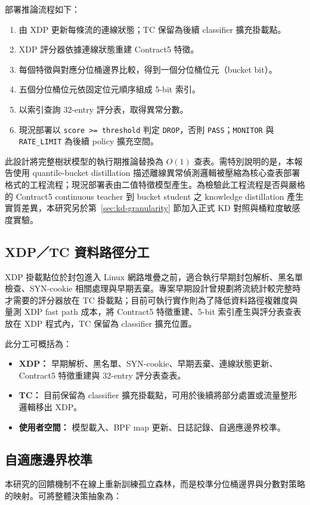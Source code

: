 \documentclass[12pt, a4paper, fontset=none]{ctexart}
\newcommand{\code}[1]{\texttt{#1}}
\begin{document}
部署推論流程如下：

\begin{enumerate}
  \item 由 XDP 更新每條流的連線狀態；TC 保留為後續 classifier 擴充掛載點。
  \item XDP 評分器依據連線狀態重建 Contract5 特徵。
  \item 每個特徵與對應分位桶邊界比較，得到一個分位桶位元（bucket bit）。
  \item 五個分位桶位元依固定位元順序組成 5-bit 索引。
  \item 以索引查詢 32-entry 評分表，取得異常分數。
  \item 現況部署以 \code{score >= threshold} 判定 \code{DROP}，否則 \code{PASS}；\code{MONITOR} 與 \code{RATE\_LIMIT} 為後續 policy 擴充空間。
\end{enumerate}

此設計將完整樹狀模型的執行期推論替換為 $O(1)$ 查表。需特別說明的是，本報告使用 quantile-bucket distillation 描述離線異常偵測邏輯被壓縮為核心查表部署格式的工程流程；現況部署表由二值特徵模型產生。為檢驗此工程流程是否與嚴格的 Contract5 continuous teacher 到 bucket student 之 knowledge distillation 產生實質差異，本研究另於第~\ref{sec:kd-granularity} 節加入正式 KD 對照與桶粒度敏感度實驗。

\subsection{XDP／TC 資料路徑分工}
XDP 掛載點位於封包進入 Linux 網路堆疊之前，適合執行早期封包解析、黑名單檢查、SYN-cookie 相關處理與早期丟棄。專案早期設計曾規劃將流統計較完整時才需要的評分器放在 TC 掛載點；目前可執行實作則為了降低資料路徑複雜度與量測 XDP fast path 成本，將 Contract5 特徵重建、5-bit 索引產生與評分表查表放在 XDP 程式內，TC 保留為 classifier 擴充位置。

此分工可概括為：

\begin{itemize}
  \item \textbf{XDP：} 早期解析、黑名單、SYN-cookie、早期丟棄、連線狀態更新、Contract5 特徵重建與 32-entry 評分表查表。
  \item \textbf{TC：} 目前保留為 classifier 擴充掛載點，可用於後續將部分處置或流量整形邏輯移出 XDP。
  \item \textbf{使用者空間：} 模型載入、BPF map 更新、日誌記錄、自適應邊界校準。
\end{itemize}

\subsection{自適應邊界校準}
本研究的回饋機制不在線上重新訓練孤立森林，而是校準分位桶邊界與分數對策略的映射。可將整體決策抽象為：
\end{document}
